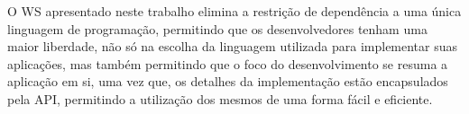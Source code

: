 \documentclass[12pt]{article}
\begin{document}

O WS apresentado neste trabalho elimina a restrição de dependência a uma
única linguagem de programação, permitindo que os desenvolvedores tenham uma maior
liberdade, não só na escolha da linguagem utilizada para implementar suas aplicações,
mas também permitindo que o foco do desenvolvimento se resuma a aplicação em si,
uma vez que, os detalhes da implementação estão encapsulados pela API,
permitindo a utilização dos mesmos de uma forma fácil e eficiente.




\end{document}
